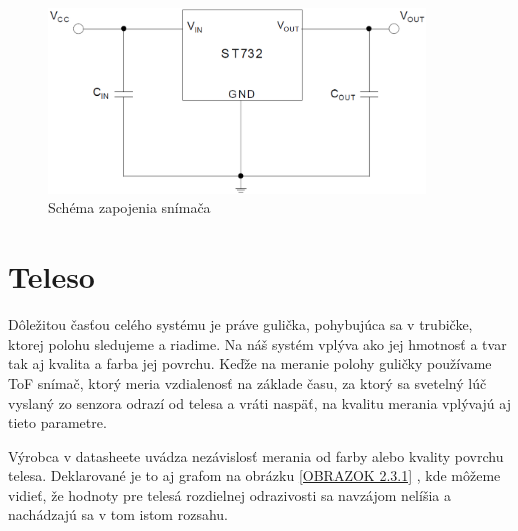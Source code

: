 \begin{figure}[]
	\centering
	\includegraphics[width=100mm]{obr/LDOscheme.eps}
	\caption{Schéma zapojenia snímača\cite{LDO}}\label{OBRAZOK 2.2.4.1} 
\end{figure} 

\section{Teleso}
\label{kap:2.3}

Dôležitou časťou celého systému je práve gulička, pohybujúca sa v trubičke, ktorej polohu sledujeme a riadime. Na náš systém vplýva ako jej hmotnosť a tvar tak aj kvalita a farba jej povrchu. Keďže na meranie polohy guličky používame ToF snímač, ktorý meria vzdialenosť na základe času, za ktorý sa svetelný lúč vyslaný zo senzora odrazí od telesa a vráti naspäť, na kvalitu merania vplývajú aj tieto parametre. 

Výrobca v datasheete \cite{VL6180X} uvádza nezávislosť merania od farby alebo kvality povrchu telesa. Deklarované je to aj grafom na obrázku \ref{OBRAZOK 2.3.1} , kde môžeme vidieť, že hodnoty pre telesá rozdielnej odrazivosti sa navzájom nelíšia a nachádzajú sa v tom istom rozsahu.

